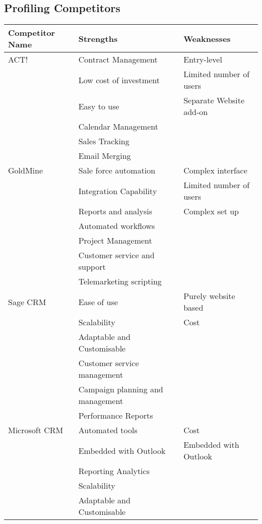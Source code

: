 \documentclass[DIV=calc, paper=a4, fontsize=11pt]{scrartcl}	 %
\begin{document}
\subsection{Profiling Competitors}
\begin{tabular}{|l|p{}|p{}|} \hline
Competitor Name & Strengths & Weaknesses \\ \hline
ACT!     & Contract Management    & Entry-level             \\
         & Low cost of investment & Limited number of users \\
         & Easy to use            & Separate Website add-on \\
         & Calendar Management    &  \\
         & Sales Tracking         &  \\
         & Email Merging          &  \\ \hline
GoldMine & Sale force automation  & Complex interface \\
         & Integration Capability & Limited number of users \\
         & Reports and analysis   & Complex set up \\
         & Automated workflows    &  \\
         & Project Management     &  \\
         & Customer service and support &  \\
         & Telemarketing scripting &  \\ \hline
Sage CRM & Ease of use            & Purely website based \\
         & Scalability            & Cost \\
         & Adaptable and Customisable & \\
         & Customer service management & \\
         & Campaign planning and management & \\
         & Performance Reports    & \\ \hline
Microsoft CRM & Automated tools   & Cost \\
         & Embedded with Outlook  & Embedded with Outlook \\ 
         & Reporting Analytics    &  \\
         & Scalability            &  \\
         & Adaptable and Customisable & \\ \hline
\end{tabular}
\end{document}
